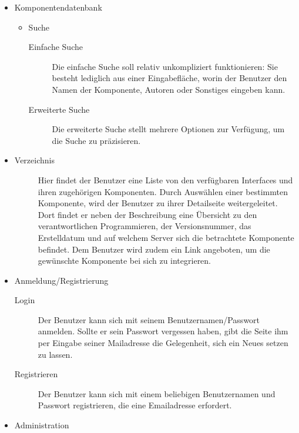 \begin{itemize}
   \item Komponentendatenbank
   \begin{itemize}
    \item Suche
      \begin{description}
       \item[Einfache Suche] Die einfache Suche soll relativ unkompliziert funktionieren:
        Sie besteht lediglich aus einer Eingabefläche, worin der Benutzer
       den Namen der Komponente, Autoren oder Sonstiges eingeben kann. 
       \item[Erweiterte Suche] Die erweiterte Suche stellt mehrere Optionen zur Verfügung, um die Suche zu präzisieren. 
       \end{description}
    \end{itemize}
    \item Verzeichnis
      \begin{description}
        \item[] Hier findet der Benutzer eine Liste von den verfügbaren Interfaces und ihren zugehörigen Komponenten.
        Durch Auswählen einer bestimmten Komponente, wird der Benutzer zu ihrer Detailseite weitergeleitet.
        Dort findet er neben der Beschreibung eine Übersicht zu den verantwortlichen Programmieren, der Versionsnummer, das Erstelldatum und auf welchem Server sich die betrachtete Komponente befindet. 
        Dem Benutzer wird zudem ein Link angeboten, um die gewünschte Komponente bei sich zu integrieren. 
      \end{description} 

    \item Anmeldung/Registrierung
      \begin{description}
        \item[Login] Der Benutzer kann sich mit seinem Benutzernamen/Passwort anmelden. Sollte er sein Passwort vergessen haben, gibt die Seite ihm per Eingabe seiner Mailadresse die Gelegenheit, sich ein Neues setzen zu lassen.
        \item[Registrieren]Der Benutzer kann sich mit einem beliebigen Benutzernamen und Passwort registrieren, die eine Emailadresse erfordert.
      \end{description}   
    
    \item Administration
 \end{itemize}
 
